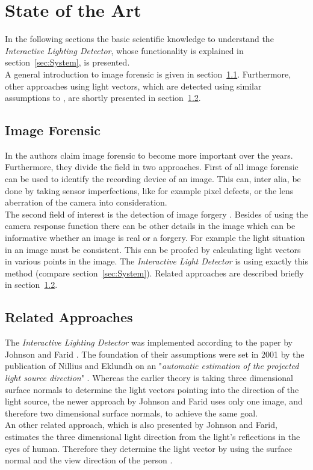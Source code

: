 \section{State of the Art} \label{sec:StateOfTheArt}
In the following sections the basic scientific knowledge to understand the \textit{Interactive Lighting Detector}, whose functionality is explained in section~\ref{sec:System}, is presented.\\
A general introduction to image forensic is given in section~\ref{sec:imageForensic}.
Furthermore, other approaches using light vectors, which are detected using similar assumptions to \cite{Johnson}, are shortly presented in section~\ref{sec:otherApproaches}.


\subsection{Image Forensic}\label{sec:imageForensic}
In \cite{4284575} the authors claim image forensic to become more important over the years. Furthermore, they divide the field in two approaches. First of all image forensic can be used to identify the recording device of an image. This can, inter alia, be done by taking sensor imperfections, like for example pixel defects, or the lens aberration of the camera into consideration. \\
The second field of interest is the detection of image forgery \cite{4806202}. Besides of using the camera response function there can be other details in the image which can be informative whether an image is real or a forgery. For example the light situation in an image must be consistent. This can be proofed by calculating light vectors in various points in the image. The \textit{Interactive Light Detector} is using exactly this method (compare section~\ref{sec:System}). Related approaches are described briefly in section~\ref{sec:otherApproaches}.


\subsection{Related Approaches} \label{sec:otherApproaches}
The \textit{Interactive Lighting Detector} was implemented according to the paper by Johnson and Farid \cite{Johnson}. The foundation of their assumptions were set in 2001 by the publication of Nillius and Eklundh on an "\textit{automatic estimation of the projected light source direction}" \cite{990650}. Whereas the earlier theory is taking three dimensional surface normals to determine the light vectors pointing into the direction of the light source, the newer approach by Johnson and Farid uses only one image, and therefore two dimensional surface normals, to achieve the same goal. \\
An other related approach, which is also presented by Johnson and Farid, estimates the three dimensional light direction from the light's reflections in the eyes of human. Therefore they determine the light vector by using the surface normal and the view direction of the person \cite{johnson06specular}.


\newpage
